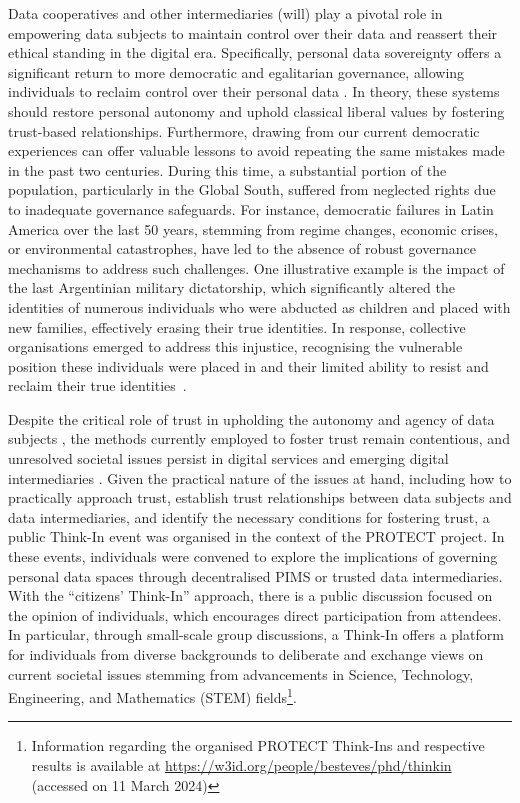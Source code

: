Data cooperatives and other intermediaries (will) play a pivotal role in empowering data subjects to maintain control over their data and reassert their ethical standing in the digital era.
Specifically, personal data sovereignty offers a significant return to more democratic and egalitarian governance, allowing individuals to reclaim control over their personal data \citep{craglia_digitranscope_2021, giannopoulou_digital_2023}.
In theory, these systems should restore personal autonomy and uphold classical liberal values by fostering trust-based relationships. %
Furthermore, drawing from our current democratic experiences can offer valuable lessons to avoid repeating the same mistakes made in the past two centuries.
During this time, a substantial portion of the population, particularly in the Global South, suffered from neglected rights due to inadequate governance safeguards. %
For instance, democratic failures in Latin America over the last 50 years, stemming from regime changes, economic crises, or environmental catastrophes, have led to the absence of robust governance mechanisms to address such challenges.
One illustrative example is the impact of the last Argentinian military dictatorship, which significantly altered the identities of numerous individuals who were abducted as children and placed with new families, effectively erasing their true identities.
In response, collective organisations emerged to address this injustice, recognising the vulnerable position these individuals were placed in and their limited ability to resist and reclaim their true identities~\citep{gesteira_mas_2014}.

Despite the critical role of trust in upholding the autonomy and agency of data subjects \citep{benshahar_more_2014}, the methods currently employed to foster trust remain contentious, and unresolved societal issues persist in digital services and emerging digital intermediaries \citep{carovano_regulating_2023}.
Given the practical nature of the issues at hand, including how to practically approach trust, establish trust relationships between data subjects and data intermediaries, and identify the necessary conditions for fostering trust, a public Think-In event was organised in the context of the PROTECT project.
In these events, individuals were convened to explore the implications of governing personal data spaces through decentralised PIMS or trusted data intermediaries.
With the ``citizens' Think-In'' approach, there is a public discussion focused on the opinion of individuals, which encourages direct participation from attendees.
In particular, through small-scale group discussions, a Think-In offers a platform for individuals from diverse backgrounds to deliberate and exchange views on current societal issues stemming from advancements in Science, Technology, Engineering, and Mathematics (STEM) fields\footnote{Information regarding the organised PROTECT Think-Ins and respective results is available at \url{https://w3id.org/people/besteves/phd/thinkin} (accessed on 11 March 2024)}. %

